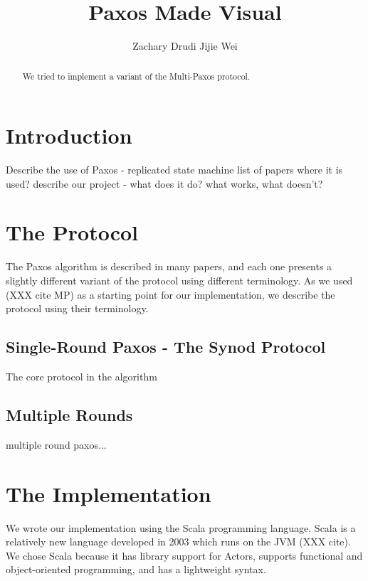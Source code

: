 \documentclass{sig-alternate}
\begin{document}
\title{Paxos Made Visual}


\author{
\alignauthor
Zachary Drudi  
\alignauthor
Jijie Wei		
}


\maketitle

\begin{abstract}
We tried to implement a variant of the Multi-Paxos protocol. 
\end{abstract}

\section{Introduction}
Describe the use of Paxos - replicated state machine
list of papers where it is used?
describe our project - what does it do? what works, what doesn't?


\section{The Protocol}

The Paxos algorithm is described in many papers, and each one presents a slightly different variant of the protocol using different terminology. As we used (XXX cite MP) as a starting point for our implementation, we describe the protocol using their terminology.

\subsection{Single-Round Paxos - The Synod Protocol}
The core protocol in the algorithm 



\subsection{Multiple Rounds}
multiple round paxos...

\section{The Implementation}

We wrote our implementation using the Scala programming language. Scala is a relatively new language developed in 2003 which runs on the JVM (XXX cite). We chose Scala because it has library support for Actors, supports functional and object-oriented programming, and has a lightweight syntax. 
\end{document}
